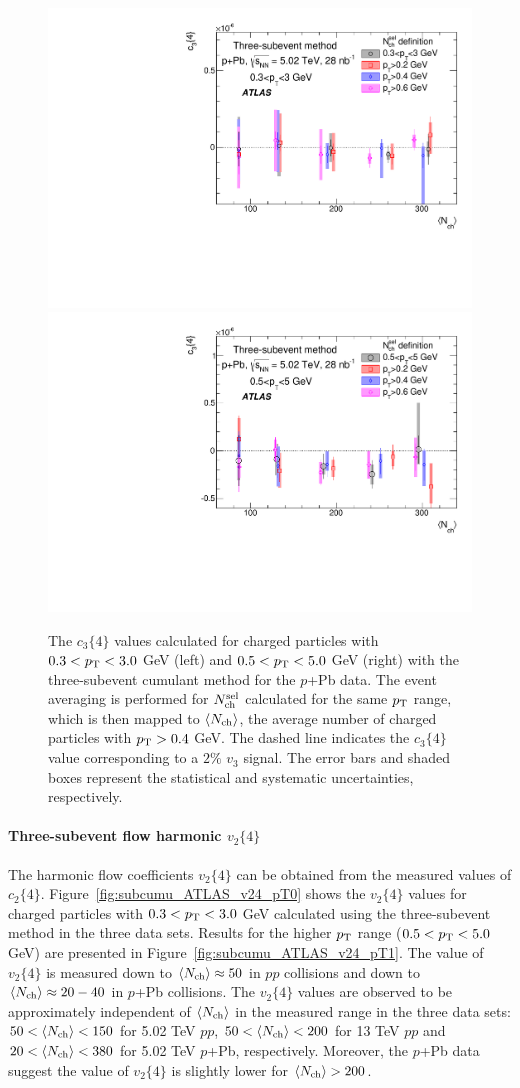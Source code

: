 \begin{figure}[H]
\centering
\includegraphics[width=.475\linewidth]{figs/chapter_subcumu/ATLAS_c34_pPb5_pT0}
\includegraphics[width=.475\linewidth]{figs/chapter_subcumu/ATLAS_c34_pPb5_pT1}
\caption{The $c_3\{4\}$ values calculated for charged particles with $0.3<p_\text{T}<3.0$ GeV (left) and $0.5<p_\text{T}<5.0$ GeV (right) with the three-subevent cumulant method for the $p$+Pb data. The event averaging is performed for $N_\text{ch}^\text{sel}$ calculated for the same $p_\text{T}$ range, which is then mapped to $\left\langle N_\text{ch}\right\rangle$, the average number of charged particles with $p_\text{T}>0.4$ GeV. The dashed line indicates the $c_3\{4\}$ value corresponding to a $2\%$ $v_3$ signal. The error bars and shaded boxes represent the statistical and systematic uncertainties, respectively.}
\label{fig:subcumu_ATLAS_c34_pPb5}
\end{figure}



\paragraph{Three-subevent flow harmonic $v_2\{4\}$}

The harmonic flow coefficients $v_2\{4\}$ can be obtained from the measured values of $c_2\{4\}$. Figure~\ref{fig:subcumu_ATLAS_v24_pT0} shows the $v_2\{4\}$ values for charged particles with $0.3<p_\text{T}<3.0$ GeV calculated using the three-subevent method in the three data sets. Results for the higher $p_\text{T}$ range ($0.5<p_\text{T}<5.0$ GeV) are presented in Figure~\ref{fig:subcumu_ATLAS_v24_pT1}. The value of $v_2\{4\}$ is measured down to $\left\langle N_\text{ch}\right\rangle\approx 50$ in $pp$ collisions and down to $\left\langle N_\text{ch}\right\rangle\approx 20-40$ in $p$+Pb collisions. The $v_2\{4\}$ values are observed to be approximately independent of $\left\langle N_\text{ch}\right\rangle$ in the measured range in the three data sets: $50<\left\langle N_\text{ch}\right\rangle<150$ for 5.02 TeV $pp$, $50<\left\langle N_\text{ch}\right\rangle<200$ for 13 TeV $pp$ and $20<\left\langle N_\text{ch}\right\rangle<380$ for 5.02 TeV $p$+Pb, respectively. Moreover, the $p$+Pb data suggest the value of $v_2\{4\}$ is slightly lower for $\left\langle N_\text{ch}\right\rangle>200$.

